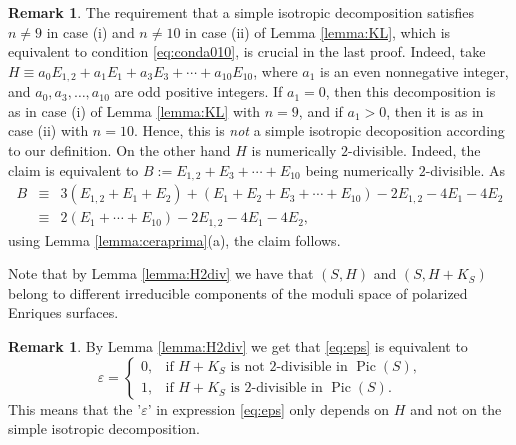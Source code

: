 \documentclass[11pt]{amsart}
\theoremstyle{definition}
\newtheorem{remark}[thm]{Remark}
\def\Pic{\operatorname{Pic}}
\begin{document}
\begin{remark} \label{ex:2divspec}
  The requirement that a simple isotropic decomposition satisfies 
$n \neq 9$ in case (i) and 
$n \neq 10$ in case (ii) of Lemma \ref{lemma:KL}, which is   equivalent to
 condition \eqref{eq:conda010},  is crucial in the last proof. Indeed, take 
$ H \equiv a_0E_{1,2}+a_1E_1+a_3E_3+\cdots+a_{10}E_{10}$, 
 where $a_1$ is an even nonnegative integer, and $a_0,a_3,\ldots,a_{10}$ are odd positive integers.  If $a_1=0$, then this decomposition is as in case (i) of Lemma \ref{lemma:KL} with $n=9$, and if $a_1>0$, then it is as in case (ii) with $n=10$. Hence, this is {\it not} a simple isotropic decoposition according to our definition. 
On the other hand $H$ is numerically $2$-divisible. Indeed, the claim is equivalent to $B:=E_{1,2}+E_3+\cdots+E_{10}$ being numerically $2$-divisible.
As
 \begin{eqnarray*}
   B & \equiv & 3(E_{1,2}+E_1+E_2) +(E_1+E_2+E_3+\cdots+E_{10})-2E_{1,2}-4E_1-4E_2 \\
     & \equiv &2 (E_1+\cdots+E_{10})-2E_{1,2}-4E_1-4E_2,
 \end{eqnarray*}
 using Lemma \ref{lemma:ceraprima}(a), the claim follows. 

 Note that by  Lemma \ref{lemma:H2div} we have that $(S,H)$ and $(S,H+K_S)$ belong to different irreducible components of the moduli space of polarized Enriques surfaces. 
\end{remark}



\begin{remark} \label{rem:eps}
  By Lemma \ref{lemma:H2div} we get that \eqref{eq:eps} is equivalent to
\begin{equation} \label{eq:eps2}
\varepsilon= \begin{cases} 0, & \mbox{if $H+K_S$ is not $2$-divisible in $\Pic(S)$,} \\
1, & \mbox{if $H+K_S$ is $2$-divisible in $\Pic(S)$.} 
\end{cases}
\end{equation} 
This means that the '$\varepsilon$' in expression \eqref{eq:eps} only depends on $H$ and not on the simple isotropic decomposition.
\end{remark}



 
\end{document}
